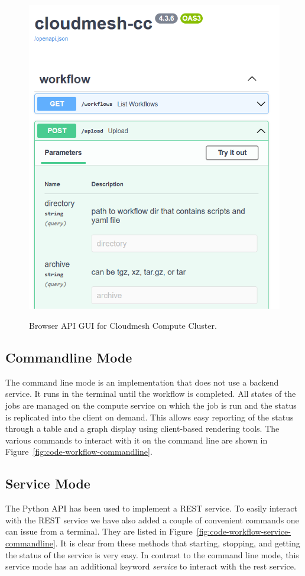 \begin{figure}[htb]
{\centering
\includegraphics[width=0.52\columnwidth]{images/upload_api.png}
}
\caption{Browser API GUI for Cloudmesh Compute Cluster.}

\label{fig:openapi}

\end{figure}


\subsection{Commandline Mode}

The command line mode is an implementation that does not use a backend
service. It runs in the terminal until the workflow is completed. All
states of the jobs are managed on the compute service on which the job
is run and the status is replicated into the client on demand. This
allows easy reporting of the status through a table and a graph
display using client-based rendering tools. The various commands to
interact with it on the command line are shown in
Figure~\ref{fig:code-workflow-commandline}.


\subsection{Service Mode}

The Python API has been used to implement a REST service. To
easily interact with the REST service we have also added a couple of
convenient commands one can issue from a terminal. They are listed
in Figure~\ref{fig:code-workflow-service-commandline}. It is clear from
these methods that starting, stopping, and getting the status of the
service is very easy. In contrast to the command line mode, this service
mode has an additional keyword {\em service} to interact with the rest service.

